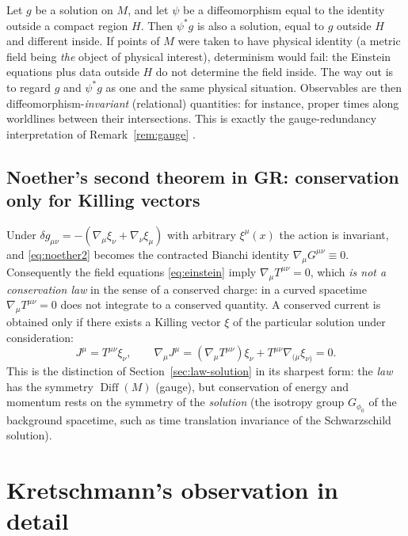 \documentclass[11pt,a4paper,openany]{book}
\theoremstyle{definition}
\theoremstyle{plain}
\theoremstyle{remark}
\DeclareMathOperator{\Diff}{Diff}
\begin{document}
Let $g$ be a solution on $M$, and let $\psi$ be a diffeomorphism equal to the
identity outside a compact region $H$. Then $\psi^*g$ is also a solution,
equal to $g$ outside $H$ and different inside. If points of $M$ were taken to
have physical identity (a metric field being \emph{the} object of physical
interest), determinism would fail: the Einstein equations plus data outside $H$
do not determine the field inside. The way out is to regard $g$ and $\psi^*g$
as one and the same physical situation. Observables are then
diffeomorphism-\emph{invariant} (relational) quantities: for instance,
proper times along worldlines between their intersections. This is exactly
the gauge-redundancy interpretation of Remark~\ref{rem:gauge}
\cite{earman,norton}.

\subsection{Noether's second theorem in GR: conservation only for Killing vectors}

Under $\delta g_{\mu\nu}=-(\nabla_\mu\xi_\nu+\nabla_\nu\xi_\mu)$ with arbitrary
$\xi^\mu(x)$ the action is invariant, and \eqref{eq:noether2} becomes the
contracted Bianchi identity $\nabla_\mu G^{\mu\nu}\equiv0$. Consequently the
field equations \eqref{eq:einstein} imply $\nabla_\mu T^{\mu\nu}=0$, which
\emph{is not a conservation law} in the sense of a conserved charge: in a
curved spacetime $\nabla_\mu T^{\mu\nu}=0$ does not integrate to a conserved
quantity. A conserved current is obtained only if there exists a Killing vector
$\xi$ of the particular solution under consideration:
\begin{equation}
  J^\mu=T^{\mu\nu}\xi_\nu,\qquad
  \nabla_\mu J^\mu=(\nabla_\mu T^{\mu\nu})\xi_\nu+T^{\mu\nu}\nabla_{(\mu}\xi_{\nu)}=0.
\end{equation}
This is the distinction of Section~\ref{sec:law-solution} in its
sharpest form: the \emph{law} has the symmetry $\Diff(M)$ (gauge), but
conservation of energy and momentum rests on the symmetry of the \emph{solution}
(the isotropy group $G_{\phi_0}$ of the background spacetime, such as time
translation invariance of the Schwarzschild solution).

\section{Kretschmann's observation in detail}
\label{sec:kretschmann}
\end{document}
